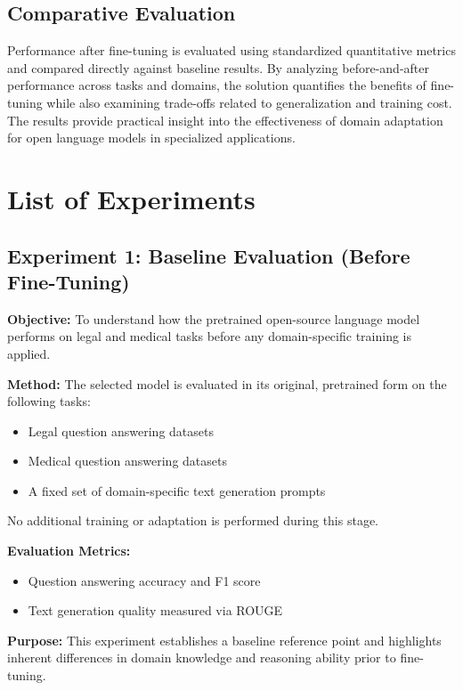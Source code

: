 \documentclass[12pt, letterpaper]{article}
\begin{document}
\subsection{Comparative Evaluation}

Performance after fine-tuning is evaluated using standardized quantitative metrics and compared directly against baseline results. By analyzing before-and-after performance across tasks and domains, the solution quantifies the benefits of fine-tuning while also examining trade-offs related to generalization and training cost. The results provide practical insight into the effectiveness of domain adaptation for open language models in specialized applications.

\section{List of Experiments}
\label{sec:experiments}

\subsection{Experiment 1: Baseline Evaluation (Before Fine-Tuning)}

\textbf{Objective:} To understand how the pretrained open-source language model performs on legal and medical tasks before any domain-specific training is applied.

\textbf{Method:} The selected model is evaluated in its original, pretrained form on the following tasks:
\begin{itemize}
    \item Legal question answering datasets
    \item Medical question answering datasets
    \item A fixed set of domain-specific text generation prompts
\end{itemize}
No additional training or adaptation is performed during this stage.

\textbf{Evaluation Metrics:}
\begin{itemize}
    \item Question answering accuracy and F1 score
    \item Text generation quality measured via ROUGE
\end{itemize}

\textbf{Purpose:} This experiment establishes a baseline reference point and highlights inherent differences in domain knowledge and reasoning ability prior to fine-tuning.
\end{document}
